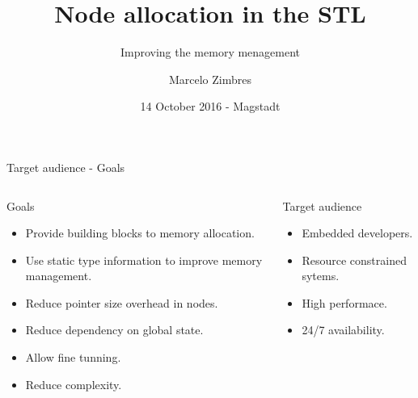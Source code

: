 \documentclass[10pt,aspectratio=169]{beamer}
\title[Node allocation in the STL] {Node allocation in the STL}
\subtitle[Improving the memory menagement] {Improving the memory menagement}
\author[Marcelo Zimbres] {Marcelo Zimbres}
\institute[Presentation to WG21-SG14]
{
  
}
\date[Magstadt - Germany] {14 October 2016 - Magstadt}
\begin{document}
\begin{frame}
  \titlepage
\end{frame}






\begin{frame}[t]{Target audience - Goals}{}
\begin{columns}
\begin{column}{0.50\textwidth}
\begin{block} {Goals}
\begin{itemize}
    \item Provide building blocks to memory allocation.
    \item Use static type information to improve memory management.
    \item Reduce pointer size overhead in nodes.
    \item Reduce dependency on global state.
    \item Allow fine tunning.
    \item Reduce complexity.
\end{itemize}
\end{block}

\end{column}

\begin{column}{0.35\textwidth}
\begin{block} {Target audience}
\begin{itemize}
    \item Embedded developers.
    \item Resource constrained sytems.
    \item High performace.
    \item 24/7 availability.
\end{itemize}
\end{block}
\end{column}
\end{columns}
\end{frame}
\end{document}
